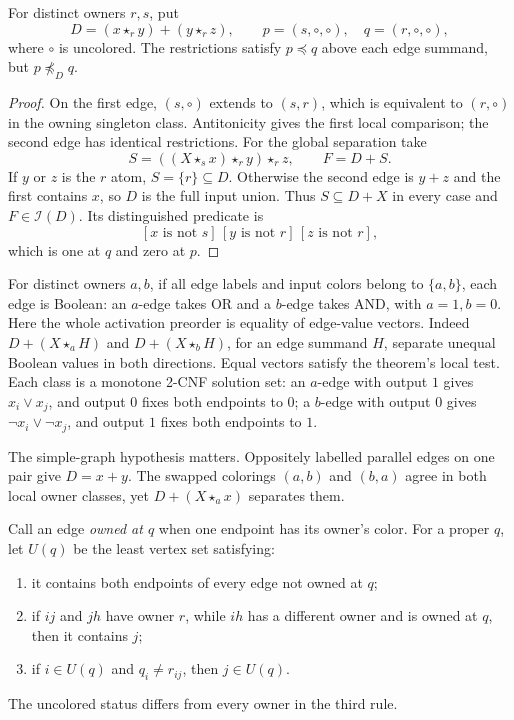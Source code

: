 \begin{proposition}
\label{core:prop:graph-order-nonfactorization}
For distinct owners $r,s$, put
\[
 D=(x\star_r y)+(y\star_r z),\qquad
 p=(s,\circ,\circ),\quad q=(r,\circ,\circ),
\]
where $\circ$ is uncolored. The restrictions satisfy
$p\preceq q$ above each edge summand, but $p\not\preceq_Dq$.
\end{proposition}
\begin{proof}
On the first edge, $(s,\circ)$ extends to $(s,r)$, which is
equivalent to $(r,\circ)$ in the owning singleton class.
Antitonicity gives the first local comparison; the second edge has
identical restrictions. For the global separation take
\[
 S=((X\star_s x)\star_r y)\star_r z,\qquad F=D+S.
\]
If $y$ or $z$ is the $r$ atom, $S=\{r\}\subseteq D$.
Otherwise the second edge is $y+z$ and the first contains $x$,
so $D$ is the full input union. Thus $S\subseteq D+X$ in every
case and $F\in\mathcal I(D)$. Its distinguished predicate is
\[
 [x\text{ is not }s]\,[y\text{ is not }r]\,[z\text{ is not }r],
\]
which is one at $q$ and zero at $p$.
\end{proof}

For distinct owners $a,b$, if all edge labels and input colors belong
to $\{a,b\}$, each edge
is Boolean: an $a$-edge takes OR and a $b$-edge takes AND, with
$a=1,b=0$. Here the whole activation preorder is equality of edge-value
vectors. Indeed $D+(X\star_a H)$ and $D+(X\star_b H)$, for an
edge summand $H$, separate unequal Boolean values in both directions.
Equal vectors satisfy the theorem's local test.
Each class is a monotone 2-CNF solution set: an $a$-edge with output
$1$ gives $x_i\lor x_j$, and output $0$ fixes both endpoints to $0$;
a $b$-edge with output $0$ gives $\neg x_i\lor\neg x_j$, and
output $1$ fixes both endpoints to $1$.

The simple-graph hypothesis matters. Oppositely labelled parallel
edges on one pair give $D=x+y$. The swapped colorings $(a,b)$ and
$(b,a)$ agree in both local owner classes, yet
$D+(X\star_a x)$ separates them.

Call an edge \emph{owned at $q$} when one endpoint has its owner's
color. For a proper $q$, let $U(q)$ be the least vertex set satisfying:
\begin{enumerate}
\item it contains both endpoints of every edge not owned at $q$;
\item if $ij$ and $jh$ have owner $r$, while $ih$ has a different
  owner and is owned at $q$, then it contains $j$;
\item if $i\in U(q)$ and $q_i\ne r_{ij}$, then $j\in U(q)$.
\end{enumerate}
The uncolored status differs from every owner in the third rule.

